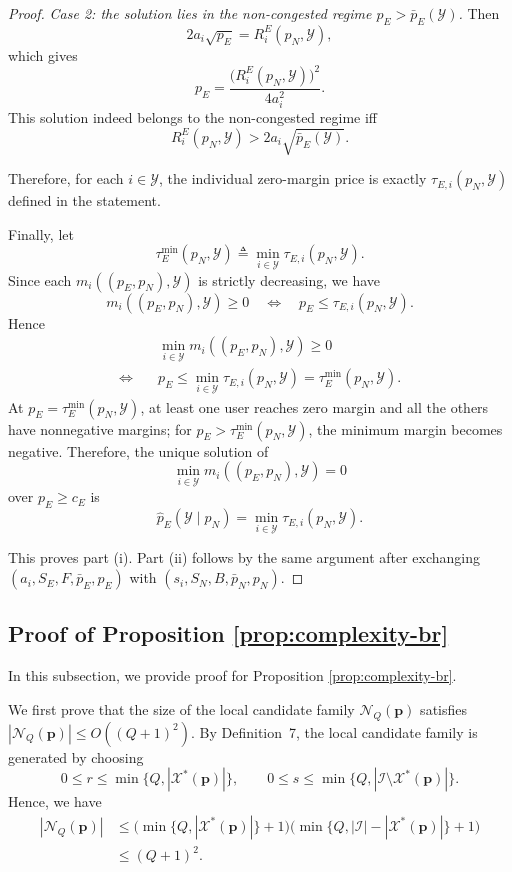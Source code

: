 \documentclass[lettersize,journal]{IEEEtran}
\begin{document}
\begin{proof}
\emph{Case 2: the solution lies in the non-congested regime $p_E>\bar p_E(\mathcal Y)$.}
Then
\[
2a_i\sqrt{p_E}=R_i^E(p_N,\mathcal Y),
\]
which gives
\[
p_E=\frac{\bigl(R_i^E(p_N,\mathcal Y)\bigr)^2}{4a_i^2}.
\]
This solution indeed belongs to the non-congested regime iff
\[
R_i^E(p_N,\mathcal Y)>2a_i\sqrt{\bar p_E(\mathcal Y)}.
\]

Therefore, for each $i\in\mathcal Y$, the individual zero-margin price is exactly
$\tau_{E,i}(p_N,\mathcal Y)$ defined in the statement.

Finally, let
\[
\tau_E^{\min}(p_N,\mathcal Y)\triangleq \min_{i\in\mathcal Y}\tau_{E,i}(p_N,\mathcal Y).
\]
Since each $m_i((p_E,p_N),\mathcal Y)$ is strictly decreasing, we have
\[
m_i((p_E,p_N),\mathcal Y)\ge 0
\quad\Longleftrightarrow\quad
p_E\le \tau_{E,i}(p_N,\mathcal Y).
\]
Hence
\begin{align*}
   & \min_{i\in\mathcal Y} m_i((p_E,p_N),\mathcal Y)\ge 0
\\\Longleftrightarrow\quad
&p_E\le \min_{i\in\mathcal Y}\tau_{E,i}(p_N,\mathcal Y)
=
\tau_E^{\min}(p_N,\mathcal Y).
\end{align*}
At $p_E=\tau_E^{\min}(p_N,\mathcal Y)$, at least one user reaches zero margin and all the others have nonnegative margins; for
$p_E>\tau_E^{\min}(p_N,\mathcal Y)$, the minimum margin becomes negative. Therefore,
the unique solution of
\[
\min_{i\in\mathcal Y} m_i((p_E,p_N),\mathcal Y)=0
\]
over $p_E\ge c_E$ is
\[
\widehat p_E(\mathcal Y\mid p_N)
=
\min_{i\in\mathcal Y}\tau_{E,i}(p_N,\mathcal Y).
\]

This proves part (i). Part (ii) follows by the same argument after exchanging
$(a_i,S_E,F,\bar p_E,p_E)$ with $(s_i,S_N,B,\bar p_N,p_N)$.
\end{proof}

\subsection{Proof of Proposition \ref{prop:complexity-br}}\label{proof:complexity-br}
In this subsection, we provide proof for Proposition \ref{prop:complexity-br}.

We first prove that the size of the local candidate family $\mathcal{N}_Q(\boldsymbol{p})$ satisfies $|\mathcal{N}_Q(\boldsymbol{p})|\le O((Q+1)^2)$.
By Definition~7, the local candidate family is generated by choosing
\[
0 \le r \le \min\{Q, |\mathcal X^\ast(\boldsymbol p)|\},
\qquad
0 \le s \le \min\{Q, |\mathcal I \setminus \mathcal X^\ast(\boldsymbol p)|\}.
\]
Hence, we have
\begin{align*}
    |\mathcal N_Q(\boldsymbol p)|
&\le
\bigl(\min\{Q, |\mathcal X^\ast(\boldsymbol p)|\}+1\bigr)
\bigl(\min\{Q, |\mathcal I|-|\mathcal X^\ast(\boldsymbol p)|\}+1\bigr)\\
&\le (Q+1)^2.
\end{align*}
\end{document}

